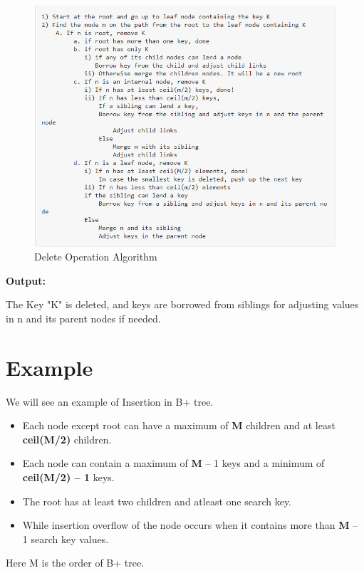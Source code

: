 \documentclass[11pt, a4paper]{article}
\begin{document}
\begin{figure}[h]
    \centering
    \includegraphics{delete.png}
    \caption{Delete Operation Algorithm}
    \label{delete}
\end{figure}

\noindent \textbf{Output:}

\noindent The Key "K" is deleted, and keys are borrowed from siblings for adjusting values in n and its parent nodes if needed.


\section{Example}

We will see an example of Insertion in B+ tree. 

\begin{itemize}
    \item Each node except root can have a maximum of \textbf{M} children and at least \textbf{ceil(M/2)} children.
    \item Each node can contain a maximum of \textbf{M} – 1 keys and a minimum of \textbf{ceil(M/2) – 1} keys.
    \item The root has at least two children and atleast one search key.
    \item While insertion overflow of the node occurs when it contains more than \textbf{M} – 1 search key values.
\end{itemize}

\noindent Here M is the order of B+ tree. \vspace{0.5cm}
\end{document}
